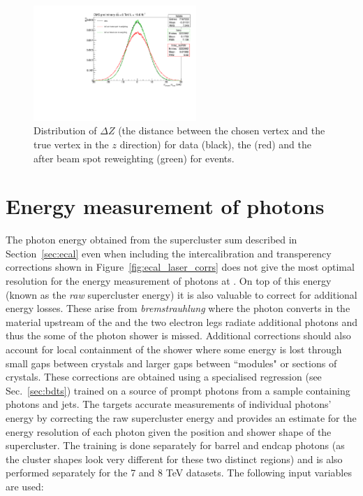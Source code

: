\begin{figure}
  \begin{center}
  \includegraphics[width=0.55\textwidth]{ch3_comm_anal_comps/plots/beamspot.pdf}
  \caption{Distribution of $\Delta Z$ (the distance between the chosen vertex and the true vertex in the $z$ direction) for data (black), the \MC (red) and the \MC after beam spot reweighting (green) for \Zmumu events.}
  \label{fig:beamspot}
  \end{center}
\end{figure}

\section{Energy measurement of photons}
\label{sec:photon_energy}

The photon energy obtained from the supercluster sum described in Section~\ref{sec:ecal} even when including the intercalibration and transperency corrections shown in Figure~\ref{fig:ecal_laser_corrs} does not give the most optimal resolution for the energy measurement of photons at \CMS. On top of this energy (known as the \emph{raw} supercluster energy) it is also valuable to correct for additional energy losses. These arise from \emph{bremstrauhlung} where the photon converts in the material upstream of the \ECAL and the two electron legs radiate additional photons and thus the some of the photon shower is missed. Additional corrections should also account for local containment of the shower where some energy is lost through small gaps between \ECAL crystals and larger gaps between ``modules" or sections of crystals. These corrections are obtained using a specialised regression \BDT (see Sec.~\ref{sec:bdts}) trained on a \MC source of prompt photons from a sample containing photons and jets. The \BDT targets accurate measurements of individual photons' energy by correcting the raw supercluster energy and provides an estimate for the energy resolution of each photon given the position and shower shape of the supercluster. The training is done separately for barrel and endcap photons (as the cluster shapes look very different for these two distinct regions) and is also performed separately for the 7 and 8 TeV datasets. The following input variables are used:


